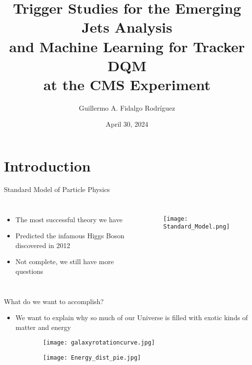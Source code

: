 \documentclass[9pt,aspectratio=169]{beamer}
\title[EMJ and ML4TkDQM]{Trigger Studies for the Emerging Jets Analysis \\and Machine Learning for Tracker DQM \\at the CMS Experiment}
\author[GAFR]{Guillermo A. Fidalgo Rodríguez}
\institute[UPRM]{University of Puerto Rico -- Mayagüez}
\date{April 30, 2024}
\begin{document}
\maketitle

\begin{frame}
	\Large
	\tableofcontents
\end{frame}

\section{Introduction}

\begin{frame}{Standard Model of Particle Physics}
	\begin{columns}

		\begin{itemize}
			\item The most successful theory we have
			      \vspace*{1cm}
			\item Predicted the infamous Higgs Boson discovered in 2012
			      \vspace{1cm}
			\item Not complete, we still have more questions
		\end{itemize}
		\begin{figure}
			\texttt{[image: Standard\_Model.png]}
		\end{figure}
	\end{columns}
\end{frame}

\begin{frame}{What do we want to accomplish?}
	\begin{itemize}
		\item We want to explain why so much of our Universe is filled with exotic kinds of matter and energy
	\end{itemize}
	\begin{figure}
		\centering
		\begin{subfigure}{0.45\linewidth}
			\texttt{[image: galaxyrotationcurve.jpg]}
		\end{subfigure}
		\begin{subfigure}{0.45\linewidth}
			\texttt{[image: Energy\_dist\_pie.jpg]}
		\end{subfigure}
	\end{figure}
\end{frame}
\end{document}
